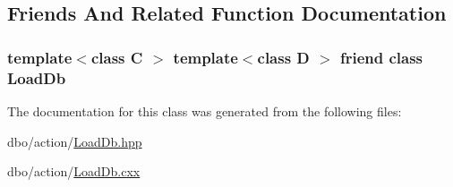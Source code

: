 \subsection{Friends And Related Function Documentation}
\hypertarget{classdbo_1_1action_1_1_load_db_addf6451e303d1fec3fb0ffc370b29e81}{
\subsubsection[{Load\+Db}]{\setlength{\rightskip}{0pt plus 5cm}template$<$class C $>$ template$<$class D $>$ friend class {\bf Load\+Db}\hspace{0.3cm}{\ttfamily [friend]}}}\label{classdbo_1_1action_1_1_load_db_addf6451e303d1fec3fb0ffc370b29e81}


The documentation for this class was generated from the following files\+:\begin{DoxyCompactItemize}
\item 
dbo/action/\hyperlink{_load_db_8hpp}{Load\+Db.\+hpp}\item 
dbo/action/\hyperlink{_load_db_8cxx}{Load\+Db.\+cxx}\end{DoxyCompactItemize}
